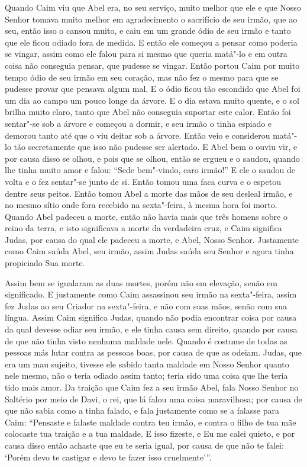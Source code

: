 Quando Caim viu que Abel era, no seu serviço, muito melhor que ele e que Nosso
Senhor tomava muito melhor em agradecimento o sacrifício de seu irmão, que ao
seu, então isso o cansou muito, e caiu em um grande ódio de seu irmão e tanto
que ele ficou odiado fora de medida. E então ele começou a pensar como poderia
se vingar, assim como ele falou para si mesmo que queria matá"-lo e em outra
coisa não conseguia pensar, que pudesse se vingar. Então portou Caim por muito
tempo ódio de seu irmão em seu coração, mas não fez o mesmo para que se pudesse
provar que pensava algum mal. E o ódio ficou tão escondido que Abel foi um dia
ao campo um pouco longe da árvore. E o dia estava muito quente, e o sol brilha
muito claro, tanto que Abel não conseguia suportar este calor. Então foi
sentar"-se sob a árvore e começou a dormir, e seu irmão o tinha espiado e
demorou tanto até que o viu deitar sob a árvore. Então veio e considerou
matá"-lo tão secretamente que isso não pudesse ser alertado. E Abel bem o ouviu
vir, e por causa disso se olhou, e pois que se olhou, então se ergueu e o
saudou, quando lhe tinha muito amor e falou: “Sede bem"-vindo, caro irmão!” E
ele o saudou de volta e o fez sentar"-se junto de si. Então tomou uma faca curva
e o espetou dentre seus peitos. Então tomou Abel a morte das mãos de seu
desleal irmão, e no mesmo sítio onde fora recebido na sexta"-feira, à mesma hora
foi morto. Quando Abel padeceu a morte, então não havia mais que três homens
sobre o reino da terra, e isto significava a morte da verdadeira cruz, e Caim
significa Judas, por causa do qual ele padeceu a morte, e Abel, Nosso Senhor.
Justamente como Caim saúda Abel, seu irmão, assim Judas saúda seu Senhor e
agora tinha propiciado Sua morte.

Assim bem se igualaram as duas mortes, porém não em elevação, senão em
significado. E justamente como Caim assassinou seu irmão na sexta"-feira, assim
fez Judas ao seu Criador na sexta"-feira, e não com suas mãos, senão com sua
língua. Assim Caim significa Judas, quando não podia encontrar coisa por causa
da qual devesse odiar seu irmão, e ele tinha causa sem direito, quando por
causa de que não tinha visto nenhuma maldade nele. Quando é costume de todas as
pessoas más lutar contra as pessoas boas, por causa de que as odeiam. Judas,
que era um mau sujeito, tivesse ele sabido tanta maldade em Nosso Senhor quanto
nele mesmo, não o teria odiado assim tanto; teria sido uma coisa que lhe teria
tido mais amor. Da traição que Caim fez a seu irmão Abel, fala Nosso Senhor no
Saltério por meio de Davi, o rei, que lá falou uma coisa maravilhosa; por causa
de que não sabia como a tinha falado, e fala justamente como se a falasse para
Caim: “Pensaste e falaste maldade contra teu irmão, e contra o filho de tua mãe
colocaste tua traição e a tua maldade. E isso fizeste, e Eu me calei quieto, e
por causa disso então achaste que eu te seria igual, por causa de que não te
falei: ‘Porém devo te castigar e devo te fazer isso cruelmente’”. 

